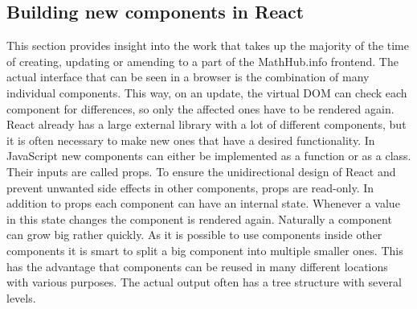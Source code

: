 \documentclass[11pt,a4paper]{article}
\begin{document}
\subsection{Building new components in React} \label{components} 
This section provides insight into the work that takes up the majority of the time of creating, updating or amending to a part of the MathHub.info frontend. 
The actual interface that can be seen in a browser is the combination of many individual components.
This way, on an update, the virtual DOM can check each component for differences, so only the affected ones have to be rendered again.
\newline \newline
React already has a large external library with a lot of different components, but it is often necessary to make new ones that have a desired functionality.
In JavaScript new components can either be implemented as a function or as a class.
Their inputs are called props.
To ensure the unidirectional design of React and prevent unwanted side effects in other components, props are read-only.
In addition to props each component can have an internal state.
Whenever a value in this state changes the component is rendered again.
Naturally a component can grow big rather quickly.
As it is possible to use components inside other components it is smart to split a big component into multiple smaller ones.
This has the advantage that components can be reused in many different locations with various purposes.
The actual output often has a tree structure with several levels.
\end{document}
